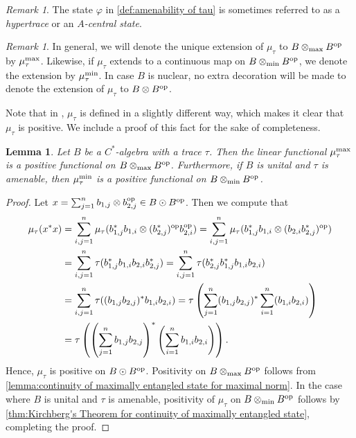 \documentclass[11pt, a4paper, oneside, final, reqno]{amsart}
\theoremstyle{definition}
\theoremstyle{plain}
\newtheorem{lemma}[definition]{Lemma}
\theoremstyle{remark}
\newtheorem{remark}[definition]{Remark}
\numberwithin{equation}{section}
\begin{document}
\begin{remark}
    The state $\varphi$ in \cref{def:amenability of tau} is sometimes referred to as a \emph{hypertrace} or an \emph{$A$-central state}.
\end{remark}

\begin{remark}
    In general, we will denote the unique extension of $\mu_\tau$ to $B \otimes_{\rm max} B^{\rm op}$ by $\mu_\tau^{\rm max}$. Likewise, if $\mu_\tau$ extends to a continuous map on $B \otimes_{\rm min} B^{\rm op}$, we denote the extension by $\mu_\tau^{\rm min}$. In case $B$ is nuclear, no extra decoration will be made to denote the extension of $\mu_\tau$ to $B \otimes B^{\rm op}$.
\end{remark}

Note that in \cite{BO}, $\mu_\tau$ is defined in a slightly different way, which makes it clear that $\mu_\tau$ is positive. We include a proof of this fact for the sake of completeness.

\begin{lemma}\label{lemma:positivity of maximally entangled state}
    Let $B$ be a $C^*$-algebra with a trace $\tau$. Then the linear functional $\mu_\tau^{\rm max}$ is a positive functional on $B \otimes_{\rm max} B^{\rm op}$. Furthermore, if $B$ is unital and $\tau$ is amenable, then $\mu_\tau^{\rm min}$ is a positive functional on $B \otimes_{\rm min} B^{\rm op}$.
\end{lemma}
\begin{proof}
    Let $x = \sum_{j=1}^n b_{1,j} \otimes b_{2,j}^{\rm op} \in B \odot B^{\rm op}$. Then we compute that
    \begin{align*}
        \mu_{\tau}(x^*x)
        & = \sum_{i,j=1}^n \mu_{\tau}(b_{1,j}^*b_{1,i} \otimes (b_{2,j}^*)^{\rm op}b_{2,i}^{\rm op})
        = \sum_{i,j=1}^n \mu_{\tau}(b_{1,j}^*b_{1,i} \otimes (b_{2,i}b_{2,j}^*)^{\rm op}) \\
        & = \sum_{i,j=1}^n \tau(b_{1,j}^*b_{1,i}b_{2,i}b_{2,j}^*)
        = \sum_{i,j=1}^n \tau(b_{2,j}^*b_{1,j}^*b_{1,i}b_{2,i}) \\
        & = \sum_{i,j=1}^n \tau((b_{1,j}b_{2,j})^*b_{1,i}b_{2,i})
        = \tau\left(\sum_{j=1}^n(b_{1,j}b_{2,j})^*\sum_{i=1}^n(b_{1,i}b_{2,i})\right) \\
        & = \tau\left(\left(\sum_{j=1}^n b_{1,j}b_{2,j}\right)^*\left(\sum_{i=1}^n b_{1,i}b_{2,i}\right)\right).
    \end{align*}
    Hence, $\mu_{\tau}$ is positive on $B \odot B^{\rm op}$. Positivity on $B \otimes_{\rm max} B^{\rm op}$ follows from \cref{lemma:continuity of maximally entangled state for maximal norm}. In the case where $B$ is unital and $\tau$ is amenable, positivity of $\mu_\tau$ on $B \otimes_{\rm min} B^{\rm op}$ follows by \cref{thm:Kirchberg's Theorem for continuity of maximally entangled state}, completing the proof.
\end{proof}
\end{document}
